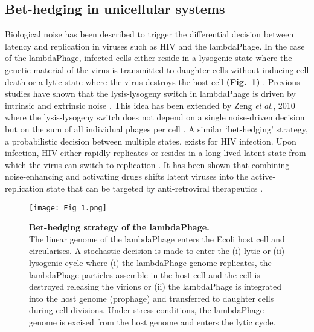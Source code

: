 \newpage

\subsection{Bet-hedging in unicellular systems}

Biological noise has been described to trigger the differential decision between latency and replication in viruses such as \Gls{HIV} and the \gls{lambdaPhage}. In the case of the \gls{lambdaPhage}, infected cells either reside in a lysogenic state where the genetic material of the virus is transmitted to daughter cells without inducing cell death or a lytic state where the virus destroys the host cell \textbf{(Fig.~\ref{fig0:bedhedging})} \citep{Lieb1953}. Previous studies have shown that the lysis-lysogeny switch in \gls{lambdaPhage} is driven by intrinsic and extrinsic noise \citep{Arkin1998, St-Pierre2008}. This idea has been extended by Zeng \textit{el al.}, 2010 where the lysis-lysogeny switch does not depend on a single noise-driven decision but on the sum of all individual phages per cell \citep{Zeng2010}. A similar ‘bet-hedging’ strategy, a probabilistic decision between multiple states, exists for \Gls{HIV} infection. Upon infection, \Gls{HIV} either rapidly replicates or resides in a long-lived latent state from which the virus can switch to replication \citep{Weinberger2015}. It has been shown that combining noise-enhancing and activating drugs shifts latent viruses into the active-replication state that can be targeted by anti-retroviral therapeutics \citep{Dar2014}. 

\begin{figure}[!h]
\centering
\texttt{[image: Fig\_1.png]}
\caption[Bet-hedging strategy of the \gls{lambdaPhage}]{\textbf{Bet-hedging strategy of the \gls{lambdaPhage}.}\\
The linear genome of the \gls{lambdaPhage} enters the \Gls{Ecoli} host cell and circularises. A stochastic decision is made to enter the (i) lytic or (ii) lysogenic cycle where (i) the \gls{lambdaPhage} genome replicates, the \gls{lambdaPhage} particles assemble in the host cell and the cell is destroyed releasing the virions or (ii) the \gls{lambdaPhage} is integrated into the host genome (prophage) and transferred to daughter cells during cell divisions. Under stress conditions, the \gls{lambdaPhage} genome is excised from the host genome and enters the lytic cycle.}
\label{fig0:bedhedging}
\end{figure}

